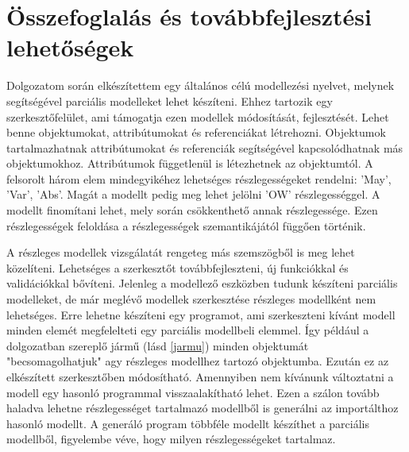 \chapter{Összefoglalás és továbbfejlesztési lehetőségek}\label{chapter:summary}
Dolgozatom során elkészítettem egy általános célú modellezési nyelvet, melynek segítségével parciális modelleket lehet készíteni. Ehhez tartozik egy szerkesztőfelület, ami támogatja ezen modellek módosítását, fejlesztését. Lehet benne objektumokat, attribútumokat és referenciákat létrehozni. Objektumok tartalmazhatnak attribútumokat és referenciák segítségével kapcsolódhatnak más objektumokhoz. Attribútumok függetlenül is létezhetnek az objektumtól. A felsorolt három elem mindegyikéhez lehetséges részlegességeket rendelni: 'May', 'Var', 'Abs'. Magát a modellt pedig meg lehet jelölni 'OW' részlegességgel. A modellt finomítani lehet, mely során csökkenthető annak részlegessége. Ezen részlegességek feloldása a részlegességek szemantikájától függően történik.
\par
A részleges modellek vizsgálatát rengeteg más szemszögből is meg lehet közelíteni. Lehetséges a szerkesztőt továbbfejleszteni, új funkciókkal és validációkkal bővíteni. Jelenleg a modellező eszközben tudunk készíteni parciális modelleket, de már meglévő modellek szerkesztése részleges modellként nem lehetséges. Erre lehetne készíteni egy programot, ami szerkeszteni kívánt modell minden elemét megfelelteti egy parciális modellbeli elemmel. Így például a dolgozatban szereplő jármű (lásd \autoref{jarmu}) minden objektumát "becsomagolhatjuk" agy részleges modellhez tartozó objektumba. Ezután ez az elkészített szerkesztőben módosítható. Amennyiben nem kívánunk változtatni a modell egy hasonló programmal visszaalakítható lehet. Ezen a szálon tovább haladva lehetne részlegességet tartalmazó modellből is generálni az importálthoz hasonló modellt. A generáló program többféle modellt készíthet a parciális modellből, figyelembe véve, hogy milyen részlegességeket tartalmaz.
